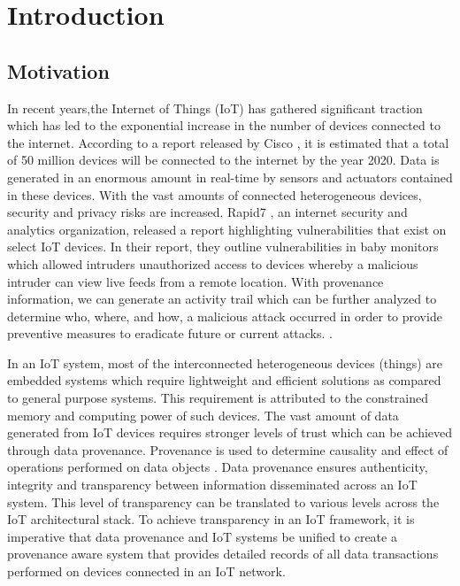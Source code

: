 \chapter{Introduction}\label{chapter:introduction}

\section{Motivation}
In recent years,the Internet of Things (IoT) has gathered significant traction which has led to the exponential increase in the number of devices connected to the internet. According to a report released by Cisco \cite{dave}, it is estimated that a total of 50 million devices will be connected to the internet by the year 2020. Data is generated in an enormous amount in real-time by sensors and actuators contained in these devices. With the vast amounts of connected heterogeneous devices,
security and privacy risks are increased. Rapid7 \cite{rapid7}, an  internet security and analytics organization, released a report highlighting vulnerabilities that exist on select IoT devices. In their report, they outline  vulnerabilities in
baby monitors which allowed intruders unauthorized access to devices
whereby a malicious intruder can view live feeds from a remote location. With provenance information, we can generate an activity trail which can be further analyzed to determine who, where, and how, a malicious attack occurred in order to provide preventive measures to eradicate future or current attacks. \cite{cheney_provenance_2009}. 
\par In an IoT system, most of the interconnected heterogeneous devices (things) are embedded systems which
require lightweight and efficient solutions as compared to general purpose
systems. This requirement is attributed to the constrained memory and computing power of such
devices. The vast amount of data generated from IoT
devices requires stronger levels of trust which can be achieved through data
provenance. Provenance is used to determine causality and effect of 
operations performed on data objects \cite{glavic_case_2011}. Data provenance ensures
authenticity, integrity and transparency between information disseminated across an
IoT system. This level of transparency can be translated to various levels across the IoT architectural stack. To achieve transparency in an IoT framework, it is imperative that data provenance and IoT systems be unified to create a provenance aware system that provides detailed records of all data
transactions performed on devices connected in an IoT network. 


